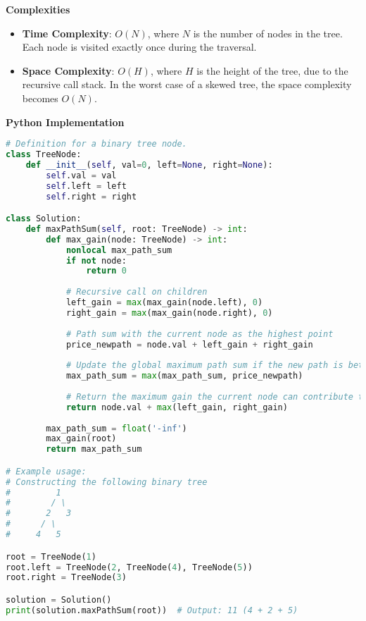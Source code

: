 \textbf{Complexities}

\begin{itemize}
    \item \textbf{Time Complexity}: \(O(N)\), where \(N\) is the number of nodes in the tree. Each node is visited exactly once during the traversal.
    \item \textbf{Space Complexity}: \(O(H)\), where \(H\) is the height of the tree, due to the recursive call stack. In the worst case of a skewed tree, the space complexity becomes \(O(N)\).
\end{itemize}

\textbf{Python Implementation}

\begin{lstlisting}[language=Python, xleftmargin=0.02\textwidth, xrightmargin=0.02\textwidth]
# Definition for a binary tree node.
class TreeNode:
    def __init__(self, val=0, left=None, right=None):
        self.val = val
        self.left = left
        self.right = right

class Solution:
    def maxPathSum(self, root: TreeNode) -> int:
        def max_gain(node: TreeNode) -> int:
            nonlocal max_path_sum
            if not node:
                return 0
            
            # Recursive call on children
            left_gain = max(max_gain(node.left), 0)
            right_gain = max(max_gain(node.right), 0)
            
            # Path sum with the current node as the highest point
            price_newpath = node.val + left_gain + right_gain
            
            # Update the global maximum path sum if the new path is better
            max_path_sum = max(max_path_sum, price_newpath)
            
            # Return the maximum gain the current node can contribute to the path
            return node.val + max(left_gain, right_gain)
        
        max_path_sum = float('-inf')
        max_gain(root)
        return max_path_sum

# Example usage:
# Constructing the following binary tree
#         1
#        / \
#       2   3
#      / \
#     4   5

root = TreeNode(1)
root.left = TreeNode(2, TreeNode(4), TreeNode(5))
root.right = TreeNode(3)

solution = Solution()
print(solution.maxPathSum(root))  # Output: 11 (4 + 2 + 5)
\end{lstlisting}

